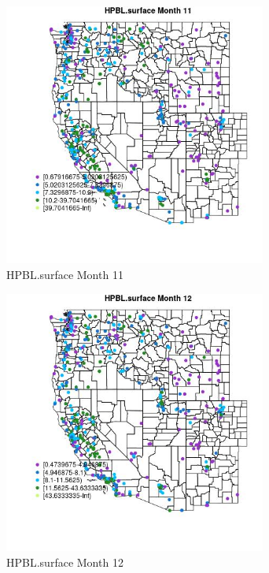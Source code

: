 \begin{figure} 
\centering  
\includegraphics[width=0.77\textwidth]{Code_Outputs/ML_input_report_ML_input_PM25_Step5_part_d_de_duplicated_aves_ML_input_MapObsMo11HPBLsurface.jpg} 
\caption{\label{fig:ML_input_report_ML_input_PM25_Step5_part_d_de_duplicated_aves_ML_inputMapObsMo11HPBLsurface}HPBL.surface Month 11} 
\end{figure} 
 

\begin{figure} 
\centering  
\includegraphics[width=0.77\textwidth]{Code_Outputs/ML_input_report_ML_input_PM25_Step5_part_d_de_duplicated_aves_ML_input_MapObsMo12HPBLsurface.jpg} 
\caption{\label{fig:ML_input_report_ML_input_PM25_Step5_part_d_de_duplicated_aves_ML_inputMapObsMo12HPBLsurface}HPBL.surface Month 12} 
\end{figure} 
 

